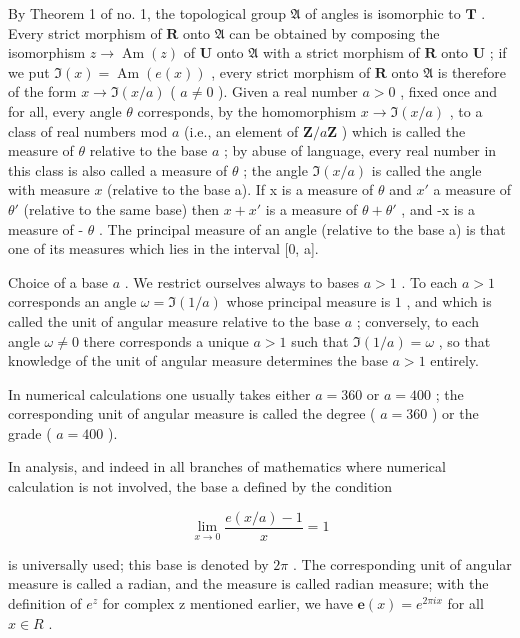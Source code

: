 By Theorem 1 of no. 1, the topological group \(\mathfrak{A}\) of angles is isomorphic to \(\mathbf{T}\) . Every strict morphism of \(\mathbf{R}\) onto \(\mathfrak{A}\) can be obtained by composing the isomorphism \(z \to \operatorname{Am}(z)\) of \(\mathbf{U}\) onto \(\mathfrak{A}\) with a strict morphism of \(\mathbf{R}\) onto \(\mathbf{U}\) ; if we put \(\Im(x) = \operatorname{Am}(e(x))\) , every strict morphism of \(\mathbf{R}\) onto \(\mathfrak{A}\) is therefore of the form \(x \to \Im(x/a)\) ( \(a \neq 0\) ). Given a real number \(a > 0\) , fixed once and for all, every angle \(\theta\) corresponds, by the homomorphism \(x \to \Im(x/a)\) , to a class of real numbers mod \(a\) (i.e., an element of \(\mathbf{Z}/a\mathbf{Z}\) ) which is called the measure of \(\theta\) relative to the base \(a\) ; by abuse of language, every real number in this class is also called a measure of \(\theta\) ; the angle \(\Im(x/a)\) is called the angle with measure \(x\) (relative to the base a). If x is a measure of \(\theta\) and \(x'\) a measure of \(\theta'\) (relative to the same base) then \(x + x'\) is a measure of \(\theta + \theta'\) , and -x is a measure of - \(\theta\) . The principal measure of an angle (relative to the base a) is that one of its measures which lies in the interval {[}0, a{]}.

Choice of a base \(a\) . We restrict ourselves always to bases \(a > 1\) . To each \(a > 1\) corresponds an angle \(\omega = \Im(1/a)\) whose principal measure is \(1\) , and which is called the unit of angular measure relative to the base \(a\) ; conversely, to each angle \(\omega \neq 0\) there corresponds a unique \(a > 1\) such that \(\Im(1/a) = \omega\) , so that knowledge of the unit of angular measure determines the base \(a > 1\) entirely.

In numerical calculations one usually takes either \(a = 360\) or \(a = 400\) ; the corresponding unit of angular measure is called the degree ( \(a = 360\) ) or the grade ( \(a = 400\) ).

In analysis, and indeed in all branches of mathematics where numerical calculation is not involved, the base a defined by the condition

\[
\lim _ {x \rightarrow 0} \frac {e (x / a) - 1}{x} = 1
\]

is universally used; this base is denoted by \(2\pi\) . The corresponding unit of angular measure is called a radian, and the measure is called radian measure; with the definition of \(e^{z}\) for complex z mentioned earlier, we have \(\boldsymbol{e}(x)=e^{2\pi ix}\) for all \(x\in R\) .

